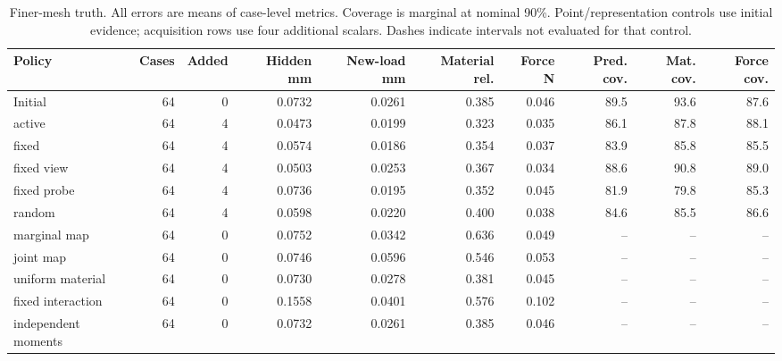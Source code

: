 \begin{table}[!t]\centering\small\setlength{\tabcolsep}{4pt}
\caption{Finer-mesh truth. All errors are means of case-level metrics. Coverage is marginal at nominal 90\%. Point/representation controls use initial evidence; acquisition rows use four additional scalars. Dashes indicate intervals not evaluated for that control.}
\begin{tabular}{lrrrrrrrrr}\toprule
Policy & Cases & Added & Hidden mm & New-load mm & Material rel. & Force N & Pred. cov. & Mat. cov. & Force cov.\\\midrule
Initial & 64 & 0 & 0.0732 & 0.0261 & 0.385 & 0.046 & 89.5 & 93.6 & 87.6\\
active & 64 & 4 & 0.0473 & 0.0199 & 0.323 & 0.035 & 86.1 & 87.8 & 88.1\\
fixed & 64 & 4 & 0.0574 & 0.0186 & 0.354 & 0.037 & 83.9 & 85.8 & 85.5\\
fixed view & 64 & 4 & 0.0503 & 0.0253 & 0.367 & 0.034 & 88.6 & 90.8 & 89.0\\
fixed probe & 64 & 4 & 0.0736 & 0.0195 & 0.352 & 0.045 & 81.9 & 79.8 & 85.3\\
random & 64 & 4 & 0.0598 & 0.0220 & 0.400 & 0.038 & 84.6 & 85.5 & 86.6\\
marginal map & 64 & 0 & 0.0752 & 0.0342 & 0.636 & 0.049 & -- & -- & --\\
joint map & 64 & 0 & 0.0746 & 0.0596 & 0.546 & 0.053 & -- & -- & --\\
uniform material & 64 & 0 & 0.0730 & 0.0278 & 0.381 & 0.045 & -- & -- & --\\
fixed interaction & 64 & 0 & 0.1558 & 0.0401 & 0.576 & 0.102 & -- & -- & --\\
independent moments & 64 & 0 & 0.0732 & 0.0261 & 0.385 & 0.046 & -- & -- & --\\
\bottomrule\end{tabular}
\end{table}

